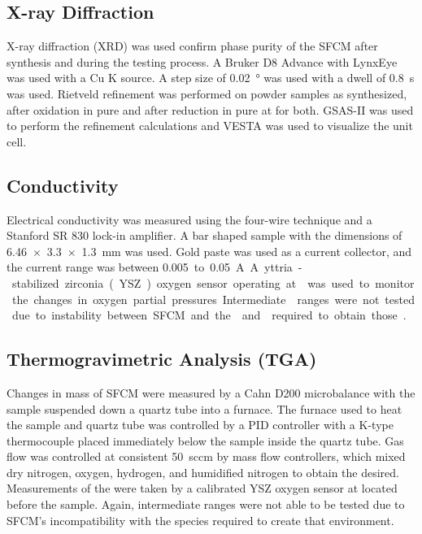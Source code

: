    \subsection{X-ray Diffraction}
        X-ray diffraction (XRD) was used confirm phase purity of the SFCM after synthesis and during the testing process.
        A Bruker D8 Advance with LynxEye was used with a Cu K\textsubscript{\textalpha{}} source.
        A step size of \SI{0.02}{\degree} was used with a dwell of \SI{0.8}{\second} was used.
        Rietveld refinement was performed on powder samples as synthesized, after oxidation in pure  and after reduction in pure  at  for both.
        GSAS-II was used to perform the refinement calculations and VESTA was used to visualize the unit cell.\cite{Toby2013,Momma2011}

    \subsection{Conductivity}
        Electrical conductivity was measured using the four-wire technique and a Stanford SR 830 lock-in amplifier.
        A bar shaped sample with the dimensions of \SI{6.46x3.3x1.3}{\milli\meter} was used.
        Gold paste was used as a current collector, and the current range was between \SI{0.005} to \SI{0.05}{A}.
        A yttria-stabilized zirconia (YSZ) oxygen sensor operating at  was used to monitor the changes in oxygen partial pressures.
        Intermediate  ranges were not tested due to instability between SFCM and the  and  required to obtain those .

    \subsection{Thermogravimetric Analysis (TGA)}
        Changes in mass of SFCM were measured by a Cahn D200 microbalance with the sample suspended down a quartz tube into a furnace.
        The furnace used to heat the sample and quartz tube was controlled by a PID controller with a K-type thermocouple placed immediately below the sample inside the quartz tube.
        Gas flow was controlled at consistent \SI{50}{sccm} by mass flow controllers, which mixed dry nitrogen, oxygen, hydrogen, and humidified nitrogen to obtain the  desired.
        Measurements of the  were taken by a calibrated YSZ oxygen sensor at  located before the sample.
        Again, intermediate  ranges were not able to be tested due to SFCM's incompatibility with the species required to create that environment.

